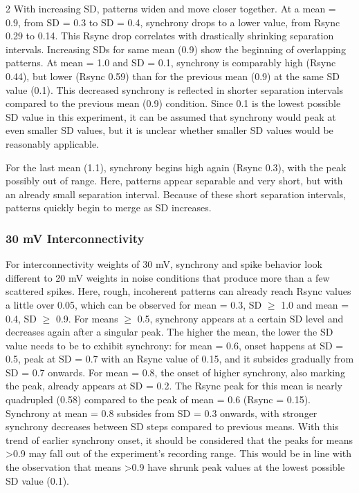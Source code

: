 \documentclass[12pt,a4paper]{article}
\begin{document}
\begin{multicols}{2}
            With increasing SD, patterns widen and move closer together. At a mean = 0.9, from SD = 0.3 to SD = 0.4, synchrony drops to a lower value, from Rsync 0.29 to 0.14. This Rsync drop correlates with drastically shrinking separation intervals. Increasing SDs for same mean (0.9) show the beginning of overlapping patterns. At mean = 1.0 and SD = 0.1, synchrony is comparably high (Rsync 0.44), but lower (Rsync 0.59) than for the previous mean (0.9) at the same SD value (0.1). This decreased synchrony is reflected in shorter separation intervals compared to the previous mean (0.9) condition. Since 0.1 is the lowest possible SD value in this experiment, it can be assumed that synchrony would peak at even smaller SD values, but it is unclear whether smaller SD values would be reasonably applicable.
            
            For the last mean (1.1), synchrony begins high again (Rsync 0.3), with the peak possibly out of range. Here, patterns appear separable and very short, but with an already small separation interval. Because of these short separation intervals, patterns quickly begin to merge as SD increases.
        
        \subsubsection{30 mV Interconnectivity}
            For interconnectivity weights of 30 mV, synchrony and spike behavior look different to 20 mV weights in noise conditions that produce more than a few scattered spikes. Here, rough, incoherent patterns can already reach Rsync values a little over 0.05, which can be observed for mean = 0.3, SD \ensuremath{\geq} 1.0 and mean = 0.4, SD \ensuremath{\geq} 0.9. For means \ensuremath{\geq} 0.5, synchrony appears at a certain SD level and decreases again after a singular peak. The higher the mean, the lower the SD value needs to be to exhibit synchrony: for mean = 0.6, onset happens at SD = 0.5, peak at SD = 0.7 with an Rsync value of 0.15, and it subsides gradually from SD = 0.7 onwards. For mean = 0.8, the onset of higher synchrony, also marking the peak, already appears at SD = 0.2. The Rsync peak for this mean is nearly quadrupled (0.58) compared to the peak of mean = 0.6 (Rsync = 0.15). Synchrony at mean = 0.8 subsides from SD = 0.3 onwards, with stronger synchrony decreases between SD steps compared to previous means. With this trend of earlier synchrony onset, it should be considered that the peaks for means \textgreater 0.9 may fall out of the experiment's recording range. This would be in line with the observation that means \textgreater 0.9 have shrunk peak values at the lowest possible SD value (0.1).
            

\end{multicols}
\end{document}
